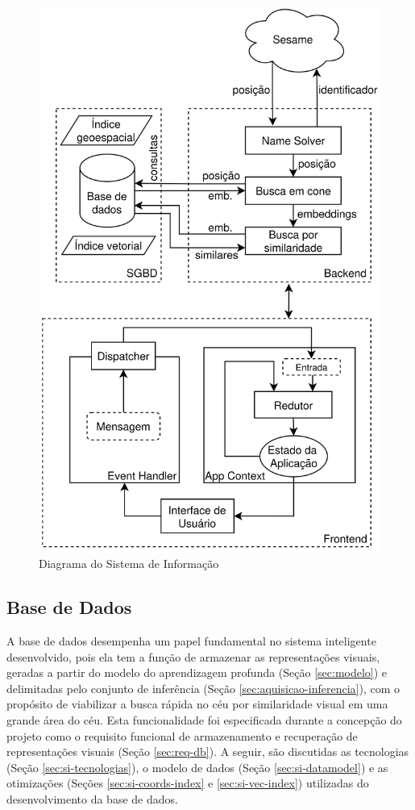 \begin{figure}[!ht]
  \centering
  \caption{Diagrama do Sistema de Informação}
  \label{fig:si}
  \includegraphics[width=0.75\linewidth]{figures/si.png}
\end{figure}





\subsection{Base de Dados}
\label{sec:si-db}

A base de dados desempenha um papel fundamental no sistema inteligente desenvolvido, pois ela tem a função de armazenar as representações visuais, geradas a partir do modelo do aprendizagem profunda (Seção \ref{sec:modelo}) e delimitadas pelo conjunto de inferência (Seção \ref{sec:aquisicao-inferencia}), com o propósito de viabilizar a busca rápida no céu por similaridade visual em uma grande área do céu. Esta funcionalidade foi especificada durante a concepção do projeto como o  requisito funcional de armazenamento e recuperação de representações visuais (Seção \ref{sec:req-db}). A seguir, são discutidas as tecnologias  (Seção \ref{sec:si-tecnologias}), o modelo de dados (Seção \ref{sec:si-datamodel}) e as otimizações (Seções \ref{sec:si-coords-index} e \ref{sec:si-vec-index}) utilizadas do desenvolvimento da base de dados.

